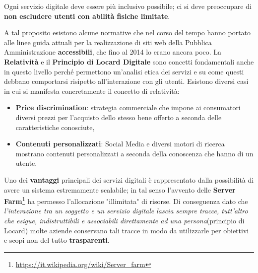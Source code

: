 \bigbreak
Ogni servizio digitale deve essere più inclusivo possibile; ci si deve preoccupare di \textbf{non escludere utenti con abilità fisiche limitate}. 

A tal proposito esistono alcune normative che nel corso del tempo hanno portato alle linee guida attuali per la realizzazione di siti web della Pubblica Amministrazione \textbf{accessibili}, che fino al 2014 lo erano ancora poco.
\bigbreak
La \textbf{Relatività} e il \textbf{Principio di Locard Digitale} sono concetti fondamentali anche in questo livello perché permettono un'analisi etica dei servizi e su come questi debbano comportarsi risipetto all'interazione con gli utenti. Esistono diversi casi in cui si manifesta concretamente il concetto di relatività:
\begin{itemize}
    \item \textbf{Price discrimination}: strategia commerciale che impone ai consumatori diversi prezzi per l’acquisto dello stesso bene offerto a seconda delle caratteristiche conosciute,
    \item \textbf{Contenuti personalizzati}: Social Media e diversi motori di ricerca mostrano contenuti personalizzati a seconda della conoscenza che hanno di un utente.
\end{itemize}
Uno dei \textbf{vantaggi} principali dei servizi digitali è rappresentato dalla possibilità di avere un sistema estremamente scalabile; in tal senso l'avvento delle \textbf{Server Farm}\footnote{\url{https://it.wikipedia.org/wiki/Server_farm}} ha permesso l'allocazione "illimitata" di risorse.
Di conseguenza dato che \emph{l’interazione tra un soggetto e un servizio digitale lascia sempre tracce, tutt’altro che esigue, indistruttibili e associabili direttamente ad una persona}(principio di Locard) molte aziende conservano tali tracce in modo da utilizzarle per obiettivi e scopi non del tutto \textbf{trasparenti}.